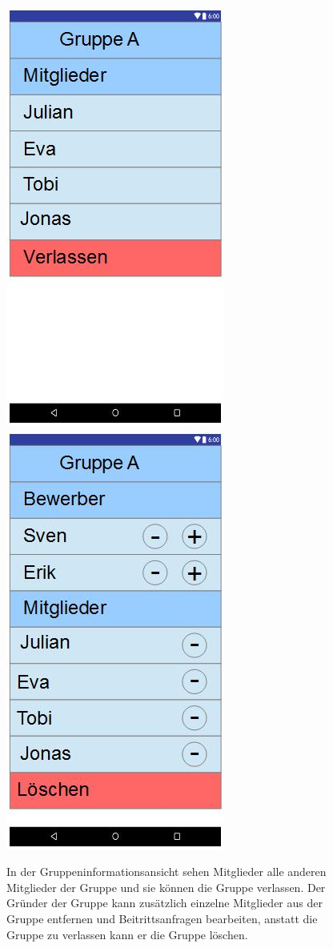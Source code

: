 \documentclass{scrartcl}
\begin{document}
	\newpage
	\begin{figure}[h]
		\includegraphics[width=.5\textwidth]{GUI_GruppeInfoNormal.jpg}
		\includegraphics[width=.5\textwidth]{GUI_GruppeInfoGruender.jpg}
		\caption{In der Gruppeninformationsansicht sehen Mitglieder alle anderen Mitglieder der Gruppe und sie können die Gruppe verlassen. Der Gründer der Gruppe kann zusätzlich einzelne Mitglieder aus der Gruppe entfernen und Beitrittsanfragen bearbeiten, anstatt die Gruppe zu verlassen kann er die Gruppe löschen.}
	\end{figure}
	
\end{document}

